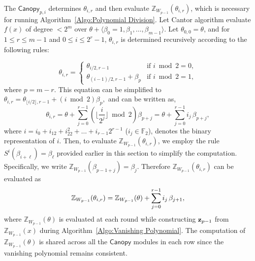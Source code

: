 The $\mathsf{Canopy}_{p, i}$ determines $\theta_{i, r}$ and then evaluate $\mathbb{Z}_{W_{p-1}}(\theta_{i, r})$, which is necessary for running Algorithm~\ref{Algo:Polynomial Division}.  Let Cantor algorithm evaluate  $f(x)$ of degree $< 2^m$ over $\theta + \langle \beta_0 = 1, \beta_1, \ldots, \beta_{m-1} \rangle$.  
Let $\theta_{0, 0} = \theta$, and for $1 \leq r \leq m-1$ and $0 \leq i \leq 2^r - 1$, $\theta_{i, r}$ is determined recursively according to the following rules:

\begin{equation*}
	\theta_{i, r} =
	\begin{cases}
		\theta_{i / 2, r - 1} & \text{if } i \bmod 2 = 0,\\
		\theta_{(i - 1) / 2, r - 1} + \beta_{p} & \text{if } i \bmod 2 = 1,
	\end{cases}
\end{equation*}
where $p=m-r$. This equation can be simplified to 
$
\theta_{i, r} = \theta_{\lfloor i / 2 \rfloor, r - 1} + (i \bmod{2}) \beta_{p},
$
and can be written as,
\begin{equation*}
	\theta_{i, r} = \theta + \sum_{j=0}^{r - 1} \left( \lfloor \frac{i}{2^j} \rfloor \bmod{2} \right) \beta_{p+j} = \theta + \sum_{j=0}^{r - 1} i_j \, \beta_{p+j},
\end{equation*}
where $i = i_0 + i_12 + i_22^2 + \ldots + i_{r-1}2^{r-1}$ ($i_j \in \mathbb{F}_2$), denotes the binary representation of $i$. Then, to evaluate $\mathbb{Z}_{W_{p-1}}(\theta_{i, r})$, we employ the rule $S^{i}(\beta_{i+\ell}) = \beta_{\ell}$ provided earlier in this section to simplify the computation. Specifically, we write $\mathbb{Z}_{W_{p-1}}(\beta_{p-1 + j}) = \beta_j$. Therefore $\mathbb{Z}_{W_{p-1}}(\theta_{i, r})$ can be evaluated as
\begin{equation*}
	\setlength{\jot}{3pt}  %
	\mathbb{Z}_{W_{p-1}}(\theta_{i, r}) =  \mathbb{Z}_{W_{p-1}}(\theta) + \sum_{j=0}^{r - 1} i_j \, \beta_{j+1},
\end{equation*}
where \(\mathbb{Z}_{W_{p-1}}(\theta)\) is evaluated at each round while constructing \({\bf{z}}_{p-1}\) from \(\mathbb{Z}_{W_{p-1}}(x)\) during Algorithm~\ref{Algo:Vanishing Polynomial}. The computation of \(\mathbb{Z}_{W_{p-1}}(\theta)\) is shared across all the \(\mathsf{Canopy}\) modules in each row since the vanishing polynomial remains consistent. 

